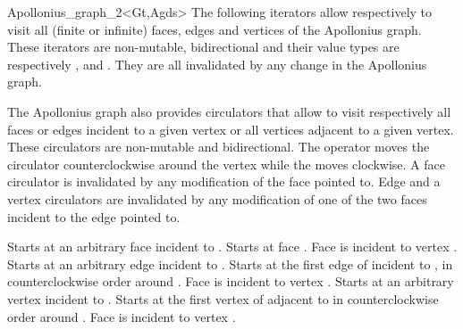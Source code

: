 \begin{ccRefClass}{Apollonius_graph_2<Gt,Agds>}
The following iterators allow respectively to visit all
(finite or infinite) faces, edges and vertices
of the Apollonius graph. These iterators are non-mutable, bidirectional
and their value types are respectively
,  and . 
They are all invalidated by any change in the Apollonius graph.


\ccGlue
{}

\ccGlue
{}

\ccGlue
{}


\ccThreeToTwo




The Apollonius graph also provides circulators that allow to visit 
respectively all faces or edges incident to a given vertex
or all vertices adjacent to a given vertex.
These circulators are non-mutable and bidirectional.
 The operator  moves the circulator
counterclockwise around the vertex while
the  moves clockwise.
A face circulator is invalidated by any modification of the face pointed to.
Edge and a vertex circulators are invalidated by any modification
of one of the two faces incident to the edge pointed to.

{Starts at an arbitrary face incident
to .}
\ccGlue
{}
{Starts at face .
\ccPrecond Face  is incident to vertex .}
\ccGlue
{}
{Starts at an arbitrary edge incident
to .}
\ccGlue
{}
{Starts at the first edge of  incident to 
, in counterclockwise order around .
\ccPrecond Face  is incident to vertex .}
\ccGlue
{}
{Starts at an arbitrary  vertex incident
to .}
\ccGlue
{}
{Starts at the first vertex of  adjacent  to 
in  counterclockwise order around .
\ccPrecond Face  is incident to vertex .}





\end{ccRefClass}
